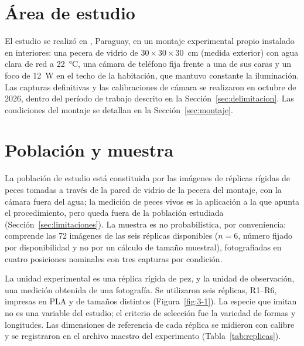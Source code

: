 \section{Área de estudio}
\label{sec:area}

El estudio se realizó en \Ciudad, Paraguay, en un montaje experimental propio instalado en interiores: una pecera de vidrio de \mbox{$30 \times 30 \times 30$}~cm (medida exterior) con agua clara de red a 22~\si{\celsius}, una cámara de teléfono fija frente a una de sus caras y un foco de 12~W en el techo de la habitación, que mantuvo constante la iluminación. Las capturas definitivas y las calibraciones de cámara se realizaron en octubre de 2026, dentro del período de trabajo descrito en la Sección~\ref{sec:delimitacion}. Las condiciones del montaje se detallan en la Sección~\ref{sec:montaje}.

\section{Población y muestra}
\label{sec:muestra}

La población de estudio está constituida por las imágenes de réplicas rígidas de peces tomadas a través de la pared de vidrio de la pecera del montaje, con la cámara fuera del agua; la medición de peces vivos es la aplicación a la que apunta el procedimiento, pero queda fuera de la población estudiada (Sección~\ref{sec:limitaciones}). La muestra es no probabilística, por conveniencia: comprende las 72 imágenes de las seis réplicas disponibles ($n = 6$, número fijado por disponibilidad y no por un cálculo de tamaño muestral), fotografiadas en cuatro posiciones nominales con tres capturas por condición.

La unidad experimental es una réplica rígida de pez, y la unidad de observación, una medición obtenida de una fotografía. Se utilizaron seis réplicas, R1--R6, impresas en PLA y de tamaños distintos (Figura~\ref{fig:3-1}). La especie que imitan no es una variable del estudio; el criterio de selección fue la variedad de formas y longitudes. Las dimensiones de referencia de cada réplica se midieron con calibre y se registraron en el archivo maestro del experimento (Tabla~\ref{tab:replicas}).

